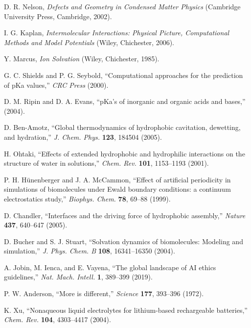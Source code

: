 \documentclass[twocolumn,prd,amsmath,amssymb,aps,superscriptaddress,nofootinbib]{revtex4-2}
\begin{document}
\begin{thebibliography}{50}
 D. R. Nelson, \textit{Defects and Geometry in Condensed Matter Physics} (Cambridge University Press, Cambridge, 2002).

 I. G. Kaplan, \textit{Intermolecular Interactions: Physical Picture, Computational Methods and Model Potentials} (Wiley, Chichester, 2006).

 Y. Marcus, \textit{Ion Solvation} (Wiley, Chichester, 1985). %

 G. C. Shields and P. G. Seybold, ``Computational approaches for the prediction of pKa values,'' \textit{CRC Press} (2000). %

 D. M. Ripin and D. A. Evans, ``pKa's of inorganic and organic acids and bases,'' (2004). %

 D. Ben-Amotz, ``Global thermodynamics of hydrophobic cavitation, dewetting, and hydration,'' \textit{J. Chem. Phys.} \textbf{123}, 184504 (2005).

 H. Ohtaki, ``Effects of extended hydrophobic and hydrophilic interactions on the structure of water in solutions,'' \textit{Chem. Rev.} \textbf{101}, 1153--1193 (2001).

 P. H. Hünenberger and J. A. McCammon, ``Effect of artificial periodicity in simulations of biomolecules under Ewald boundary conditions: a continuum electrostatics study,'' \textit{Biophys. Chem.} \textbf{78}, 69--88 (1999).

 D. Chandler, ``Interfaces and the driving force of hydrophobic assembly,'' \textit{Nature} \textbf{437}, 640--647 (2005).

 D. Bucher and S. J. Stuart, ``Solvation dynamics of biomolecules: Modeling and simulation,'' \textit{J. Phys. Chem. B} \textbf{108}, 16341--16350 (2004).

 A. Jobin, M. Ienca, and E. Vayena, ``The global landscape of AI ethics guidelines,'' \textit{Nat. Mach. Intell.} \textbf{1}, 389--399 (2019).

 P. W. Anderson, ``More is different,'' \textit{Science} \textbf{177}, 393--396 (1972).

 K. Xu, ``Nonaqueous liquid electrolytes for lithium-based rechargeable batteries,'' \textit{Chem. Rev.} \textbf{104}, 4303--4417 (2004).


\end{thebibliography}
\end{document}
